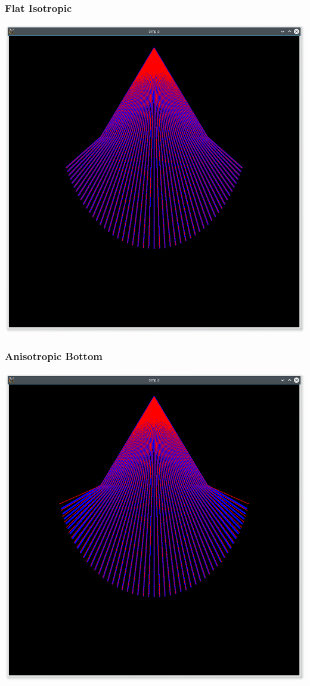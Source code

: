 \documentclass{beamer}
\begin{document}
\begin{frame}
\frametitle{Flat Isotropic}

\includegraphics[width=\textwidth]{isotropic.png}

\end{frame}

\begin{frame}
\frametitle{Anisotropic Bottom}

\includegraphics[width=\textwidth]{elliptical_bottom.png}

\end{frame}
\end{document}
